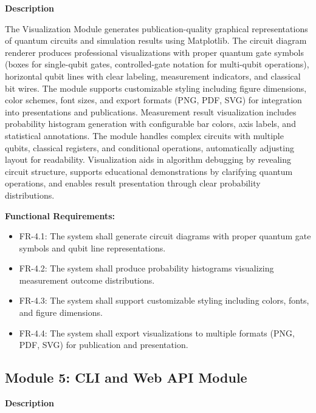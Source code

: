 \textbf{Description}

The Visualization Module generates publication-quality graphical representations of quantum circuits and simulation results using Matplotlib. The circuit diagram renderer produces professional visualizations with proper quantum gate symbols (boxes for single-qubit gates, controlled-gate notation for multi-qubit operations), horizontal qubit lines with clear labeling, measurement indicators, and classical bit wires. The module supports customizable styling including figure dimensions, color schemes, font sizes, and export formats (PNG, PDF, SVG) for integration into presentations and publications. Measurement result visualization includes probability histogram generation with configurable bar colors, axis labels, and statistical annotations. The module handles complex circuits with multiple qubits, classical registers, and conditional operations, automatically adjusting layout for readability. Visualization aids in algorithm debugging by revealing circuit structure, supports educational demonstrations by clarifying quantum operations, and enables result presentation through clear probability distributions.

\textbf{Functional Requirements:}

\begin{itemize}
    \item FR-4.1: The system shall generate circuit diagrams with proper quantum gate symbols and qubit line representations.
    \item FR-4.2: The system shall produce probability histograms visualizing measurement outcome distributions.
    \item FR-4.3: The system shall support customizable styling including colors, fonts, and figure dimensions.
    \item FR-4.4: The system shall export visualizations to multiple formats (PNG, PDF, SVG) for publication and presentation.
\end{itemize}



\subsection{Module 5: CLI and Web API Module}

\textbf{Description}

